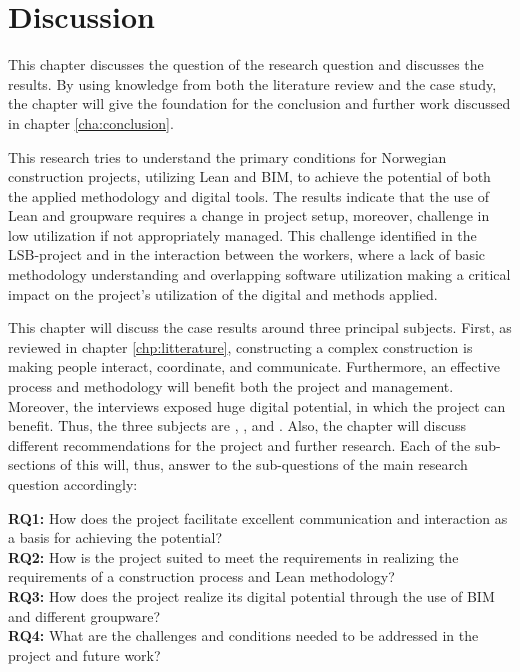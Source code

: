 
\chapter{Discussion} \label{cha:discussion}
This chapter discusses the question of the research question and discusses the results. By using knowledge from both the literature review and the case study, the chapter will give the foundation for the conclusion and further work discussed in chapter \ref{cha:conclusion}.

This research tries to understand the primary conditions for Norwegian construction projects, utilizing Lean and BIM, to achieve the potential of both the applied methodology and digital tools. The results indicate that the use of Lean and groupware requires a change in project setup, moreover, challenge in low utilization if not appropriately managed. This challenge identified in the LSB-project and in the interaction between the workers, where a lack of basic methodology understanding and overlapping software utilization making a critical impact on the project's utilization of the digital and methods applied. 

This chapter will discuss the case results around three principal subjects. First, as reviewed in chapter \ref{chp:litterature}, constructing a complex construction is making people interact, coordinate, and communicate. Furthermore, an effective process and methodology will benefit both the project and management. Moreover, the interviews exposed huge digital potential, in which the project can benefit. Thus, the three subjects are , , and . Also, the chapter will discuss different recommendations for the project and further research. Each of the sub-sections of this will, thus, answer to the sub-questions of the main research question accordingly: 

{\noindent \bf RQ1:} How does the project facilitate excellent communication and interaction as a basis for achieving the potential? \\
{\noindent  \bf RQ2:} How is the project suited to meet the requirements in realizing the requirements of a construction process and Lean methodology? \\
{\noindent  \bf RQ3:} How does the project realize its digital potential through the use of BIM and different groupware? \\
{\noindent  \bf RQ4:} What are the challenges and conditions needed to be addressed in the project and future work? \\

